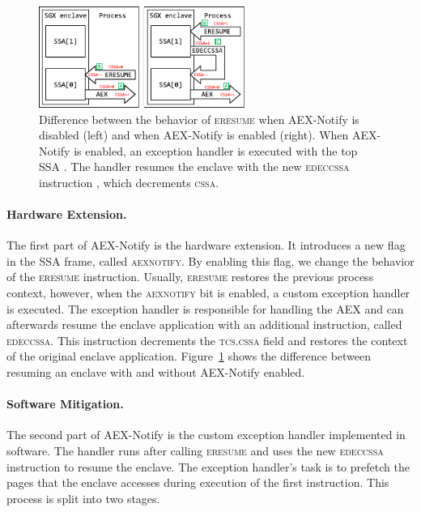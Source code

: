 \documentclass{llncs}
\begin{document}
\begin{figure}[t]
  \centering
  \includegraphics[width=0.6\textwidth]{images/sgx-ssa-edeccssa.pdf}
  \caption{Difference between the behavior of \textsc{eresume} when AEX-Notify is disabled (left) and when AEX-Notify is enabled (right).
  When AEX-Notify is enabled, an exception handler is executed with the top SSA \protect{}.
  The handler resumes the enclave with the new \textsc{edeccssa} instruction \protect{}, which decrements \textsc{cssa}.}
  \label{fig:aex-notify-edeccssa}
\end{figure}

\paragraph{Hardware Extension.}
The first part of AEX-Notify is the hardware extension.
It introduces a new flag in the SSA frame, called \textsc{aexnotify}. By
enabling this flag, we change the behavior of the \textsc{eresume} instruction.
Usually, \textsc{eresume} restores the previous process context, however, when
the \textsc{aexnotify} bit is enabled, a custom exception handler is executed.
The exception handler is responsible for handling the AEX and can afterwards
resume the enclave application with an additional instruction, called
\textsc{edeccssa}.
This instruction decrements the \textsc{tcs.cssa} field and restores the
context of the original enclave application.
Figure~\ref{fig:aex-notify-edeccssa} shows the difference between resuming an
enclave with and without AEX-Notify enabled.

\paragraph{Software Mitigation.}
The second part of AEX-Notify is the custom exception handler implemented in software.
The handler runs after calling \textsc{eresume} and
uses the new \textsc{edeccssa} instruction to resume the enclave.
The exception handler's task is to prefetch the pages that the enclave accesses during execution of the first instruction.
This process is split into two stages.
\end{document}
